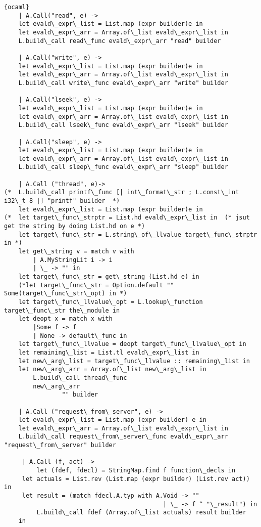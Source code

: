 \begin{lstlisting}{ocaml}
    | A.Call("read", e) ->
	let evald\_expr\_list = List.map (expr builder)e in
	let evald\_expr\_arr = Array.of\_list evald\_expr\_list in
	L.build\_call read\_func evald\_expr\_arr "read" builder

    | A.Call("write", e) ->
	let evald\_expr\_list = List.map (expr builder)e in
	let evald\_expr\_arr = Array.of\_list evald\_expr\_list in
	L.build\_call write\_func evald\_expr\_arr "write" builder

    | A.Call("lseek", e) ->
	let evald\_expr\_list = List.map (expr builder)e in
	let evald\_expr\_arr = Array.of\_list evald\_expr\_list in
	L.build\_call lseek\_func evald\_expr\_arr "lseek" builder

    | A.Call("sleep", e) ->
	let evald\_expr\_list = List.map (expr builder)e in
	let evald\_expr\_arr = Array.of\_list evald\_expr\_list in
	L.build\_call sleep\_func evald\_expr\_arr "sleep" builder

    | A.Call ("thread", e)->
(*	L.build\_call printf\_func [| int\_format\_str ; L.const\_int i32\_t 8 |] "printf" builder	*)
	let evald\_expr\_list = List.map (expr builder)e in
(*	let target\_func\_strptr = List.hd evald\_expr\_list in  (* jsut get the string by doing List.hd on e *)
	let target\_func\_str = L.string\_of\_llvalue target\_func\_strptr in *)
	let get\_string v = match v with
		| A.MyStringLit i -> i
		| \_ -> "" in
	let target\_func\_str = get\_string (List.hd e) in
	(*let target\_func\_str = Option.default "" Some(target\_func\_str\_opt) in *)
	let target\_func\_llvalue\_opt = L.lookup\_function target\_func\_str the\_module in
	let deopt x = match x with
		|Some f -> f
		| None -> default\_func in
	let target\_func\_llvalue = deopt target\_func\_llvalue\_opt in
	let remaining\_list = List.tl evald\_expr\_list in
	let new\_arg\_list = target\_func\_llvalue :: remaining\_list in
	let new\_arg\_arr = Array.of\_list new\_arg\_list in
		L.build\_call thread\_func
		new\_arg\_arr	
                "" builder

    | A.Call ("request\_from\_server", e) ->
	let evald\_expr\_list = List.map (expr builder) e in
	let evald\_expr\_arr = Array.of\_list evald\_expr\_list in
	L.build\_call request\_from\_server\_func evald\_expr\_arr "request\_from\_server" builder

     | A.Call (f, act) ->
         let (fdef, fdecl) = StringMap.find f function\_decls in
	 let actuals = List.rev (List.map (expr builder) (List.rev act)) in
	 let result = (match fdecl.A.typ with A.Void -> ""
                                            | \_ -> f ^ "\_result") in
         L.build\_call fdef (Array.of\_list actuals) result builder
    in


\end{lstlisting}
